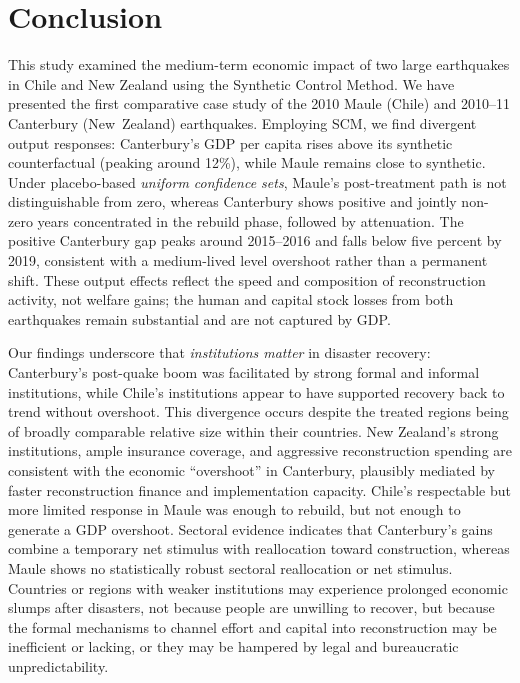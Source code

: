 \documentclass[12pt]{article}
\begin{document}
\section{Conclusion}
This study examined the medium-term economic impact of two large earthquakes in Chile and New Zealand using the Synthetic Control Method. We have presented the first comparative case study of the 2010 Maule (Chile) and 2010--11 Canterbury (New~Zealand) earthquakes. Employing SCM, we find divergent output responses: Canterbury's GDP per capita rises above its synthetic counterfactual (peaking around 12\%), while Maule remains close to synthetic. Under placebo-based \emph{uniform confidence sets}, Maule's post-treatment path is not distinguishable from zero, whereas Canterbury shows positive and jointly non-zero years concentrated in the rebuild phase, followed by attenuation. The positive Canterbury gap peaks around 2015--2016 and falls below five percent by 2019, consistent with a medium-lived level overshoot rather than a permanent shift. These output effects reflect the speed and composition of reconstruction activity, not welfare gains; the human and capital stock losses from both earthquakes remain substantial and are not captured by GDP. 

Our findings underscore that \emph{institutions matter} in disaster recovery: Canterbury's post-quake boom was facilitated by strong formal and informal institutions, while Chile's institutions appear to have supported recovery back to trend without overshoot. This divergence occurs despite the treated regions being of broadly comparable relative size within their countries. New Zealand’s strong institutions, ample insurance coverage, and aggressive reconstruction spending are consistent with the economic “overshoot” in Canterbury, plausibly mediated by faster reconstruction finance and implementation capacity. Chile’s respectable but more limited response in Maule was enough to rebuild, but not enough to generate a GDP overshoot. Sectoral evidence indicates that Canterbury’s gains combine a temporary net stimulus with reallocation toward construction, whereas Maule shows no statistically robust sectoral reallocation or net stimulus. Countries or regions with weaker institutions may experience prolonged economic slumps after disasters, not because people are unwilling to recover, but because the formal mechanisms to channel effort and capital into reconstruction may be inefficient or lacking, or they may be hampered by legal and bureaucratic unpredictability.
\end{document}
